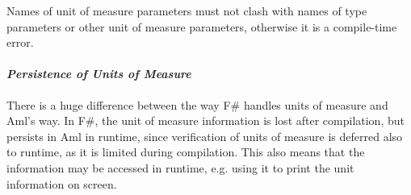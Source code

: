 Names of unit of measure parameters must not clash with names of type parameters or other unit of measure parameters, otherwise it is a compile-time error. 

\paragraph{\em Persistence of Units of Measure}
There is a huge difference between the way F\# handles units of measure and Aml's way. In F\#, the unit of measure information is lost after compilation, but persists in Aml in runtime, since verification of units of measure is deferred also to runtime, as it is limited during compilation. This also means that the information may be accessed in runtime, e.g. using it to print the unit information on screen.


